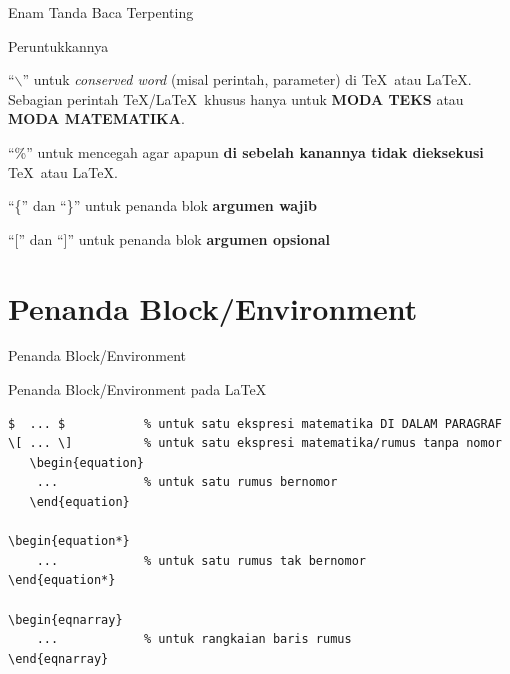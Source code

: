 \documentclass[11pt,            %
               aspectratio=169, %
               xcolor=svgnames,
               t                %
               ]{beamer}
\begin{document}
\begin{frame}
\begin{block}{Enam Tanda Baca Terpenting}
\bigskip

\centering{\hspace{0.2cm}$\backslash$\hfill\%\hfill\{\hfill\}\hfill\ [\hfill\ ]\hspace{0.2cm}}

\bigskip
\end{block}

\begin{block}{Peruntukkannya}
\bigskip

``$ \backslash $'' untuk \textit{conserved word} (misal perintah, parameter) di \TeX\ atau \LaTeX. Sebagian perintah \TeX/\LaTeX\ khusus hanya untuk \textbf{MODA TEKS} atau \textbf{MODA MATEMATIKA}.

\bigskip

``\%'' untuk mencegah agar apapun \textbf{di sebelah kanannya tidak dieksekusi} \TeX\ atau \LaTeX.

\bigskip

``\{'' dan ``\}'' untuk penanda blok \textbf{argumen wajib}

\bigskip

``['' dan ``]'' untuk penanda blok \textbf{argumen opsional}

\bigskip
\end{block}

\end{frame}

\section{Penanda Block/Environment}

\begin{frame}[containsverbatim]{Penanda Block/Environment}
\begin{block}{Penanda Block/Environment pada \LaTeX}
\begin{verbatim}
$  ... $           % untuk satu ekspresi matematika DI DALAM PARAGRAF
\[ ... \]          % untuk satu ekspresi matematika/rumus tanpa nomor
   \begin{equation}
    ...            % untuk satu rumus bernomor
   \end{equation}

\begin{equation*}
    ...            % untuk satu rumus tak bernomor
\end{equation*}

\begin{eqnarray}
    ...            % untuk rangkaian baris rumus
\end{eqnarray}
\end{verbatim}
\end{block}

\end{frame}
\end{document}
